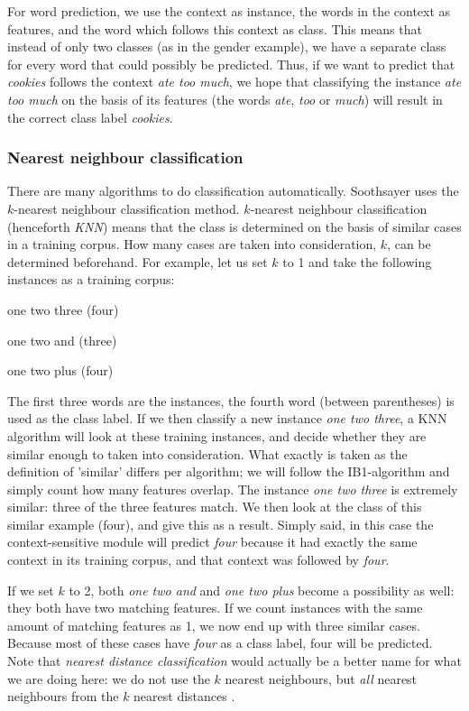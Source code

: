 \documentclass[11pt]{article}
\begin{document}
For word prediction, we use the context as instance, the words in the context as features, and the word which follows this context as class. This means that instead of only two classes (as in the gender example), we have a separate class for every word that could possibly be predicted. Thus, if we want to predict that \emph{cookies} follows the context \emph{ate too much}, we hope that classifying the instance \emph{ate too much} on the basis of its features (the words \emph{ate}, \emph{too} or \emph{much}) will result in the correct class label \emph{cookies}.

\subsubsection{Nearest neighbour classification}

There are many algorithms to do classification automatically. Soothsayer uses the $k$-nearest neighbour classification method. $k$-nearest neighbour classification (henceforth \emph{KNN}) means that the class is determined on the basis of similar cases in a training corpus. How many cases are taken into consideration, $k$, can be determined beforehand. For example, let us set $k$ to 1 and take the following instances as a training corpus:

\begin{examples}
\item one two three (four)
\item one two and (three)
\item one two plus (four)
\end{examples}

The first three words are the instances, the fourth word (between parentheses) is used as the class label. If we then classify a new instance \emph{one two three}, a KNN algorithm will look at these training instances, and decide whether they are similar enough to taken into consideration. What exactly is taken as the definition of 'similar' differs per algorithm; we will follow the IB1-algorithm \cite{aha+91} and simply count how many features overlap. The instance \emph{one two three} is extremely similar: three of the three features match. We then look at the class of this similar example (four), and give this as a result. Simply said, in this case the context-sensitive module will predict \emph{four} because it had exactly the same context in its training corpus, and that context was followed by \emph{four}.

If we set $k$ to 2, both \emph{one two and} and \emph{one two plus} become a possibility as well: they both have two matching features. If we count instances with the same amount of matching features as 1, we now end up with three similar cases. Because most of these cases have \emph{four} as a class label, four will be predicted. Note that \emph{nearest distance classification} would actually be a better name for what we are doing here: we do not use the $k$ nearest neighbours, but \emph{all} nearest neighbours from the $k$ nearest distances \cite{daelemans+97}.
\end{document}
